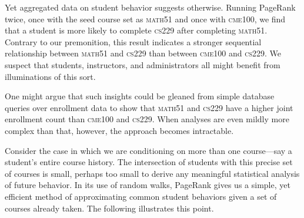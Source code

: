 Yet aggregated data on student behavior suggests otherwise. Running PageRank twice, once with the seed course set as \textsc{math51} and once with \textsc{cme100}, we find that a student is more likely to complete
\textsc{cs229} after completing \textsc{math51}. Contrary to our premonition, this result indicates a stronger sequential relationship
between \textsc{math51} and \textsc{cs229} than between \textsc{cme100} and \textsc{cs229}. We suspect that students, instructors, and administrators all might benefit from illuminations of this sort.

One might argue that such insights could be gleaned from simple
database queries over enrollment data to show that \textsc{math51} and \textsc{cs229} have a higher joint enrollment count than \textsc{cme100} and \textsc{cs229}. When analyses are even mildly more complex than that, however, the approach becomes intractable.

Consider the case in which we are conditioning on more than
one course---say a student's entire course history. The intersection
of students with this precise set of courses is small, perhaps too
small to derive any meaningful statistical analysis of future
behavior. In its use of random walks, PageRank gives us a simple, yet
efficient method of approximating common student behaviors given a set
of courses already taken. The following illustrates this point.

